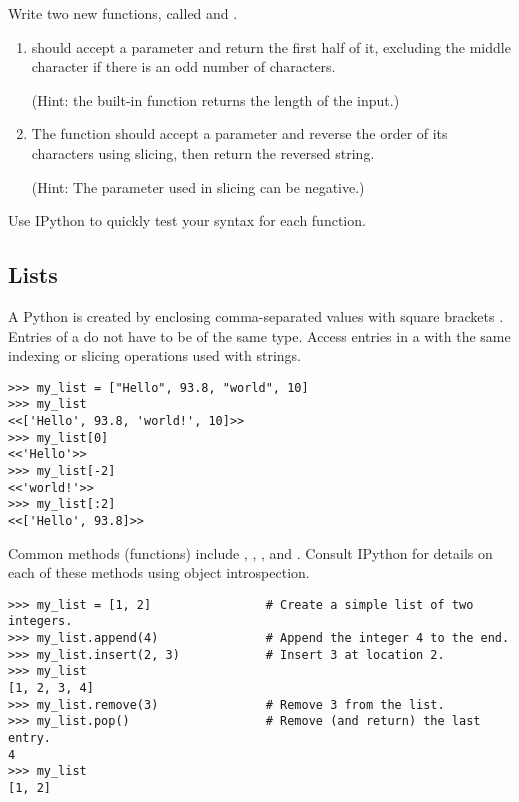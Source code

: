 \begin{problem}
Write two new functions, called  and .
\begin{enumerate}
\item {} should accept a parameter and return the first half of it, excluding the middle character if there is an odd number of characters.

(Hint: the built-in function  returns the length of the input.)
\item The  function should accept a parameter and reverse the order of its characters using slicing, then return the reversed string.

(Hint: The  parameter used in slicing can be negative.)
\end{enumerate}
Use IPython to quickly test your syntax for each function.
\end{problem}


\subsection*{Lists}
A Python  is created by enclosing comma-separated values with square brackets \li{[ ]}.
Entries of a  do not have to be of the same type.
Access entries in a  with the same indexing or slicing operations used with strings.
\begin{lstlisting}
>>> my_list = ["Hello", 93.8, "world", 10]
>>> my_list
<<['Hello', 93.8, 'world!', 10]>>
>>> my_list[0]
<<'Hello'>>
>>> my_list[-2]
<<'world!'>>
>>> my_list[:2]
<<['Hello', 93.8]>>
\end{lstlisting}

Common  methods (functions) include , , , and .
Consult IPython for details on each of these methods using object introspection.
\begin{lstlisting}
>>> my_list = [1, 2]                # Create a simple list of two integers.
>>> my_list.append(4)               # Append the integer 4 to the end.
>>> my_list.insert(2, 3)            # Insert 3 at location 2.
>>> my_list
[1, 2, 3, 4]
>>> my_list.remove(3)               # Remove 3 from the list.
>>> my_list.pop()                   # Remove (and return) the last entry.
4
>>> my_list
[1, 2]
\end{lstlisting}

